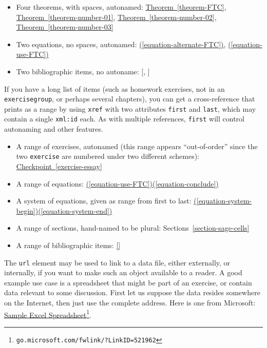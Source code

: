 \documentclass{sn-jnl}
\theoremstyle{thmstyleone}%
\theoremstyle{thmstyletwo}%
\theoremstyle{thmstylethree}%
\newcommand{\xreffont}{\relax}
\newcommand{\mono}[1]{\texttt{#1}}
\numberwithin{equation}{section}
\begin{document}
\begin{itemize}[label=\textbullet]
\item{}Four theorems, with spaces, autonamed: \hyperref[theorem-FTC]{Theorem~{\xreffont\ref{theorem-FTC}}}, \hyperref[theorem-number-01]{Theorem~{\xreffont\ref{theorem-number-01}}}, \hyperref[theorem-number-02]{Theorem~{\xreffont\ref{theorem-number-02}}}, \hyperref[theorem-number-03]{Theorem~{\xreffont\ref{theorem-number-03}}}%
\item{}Two equations, no spaces, autonamed: \hyperref[equation-alternate-FTC]{({\xreffont\ref{equation-alternate-FTC}})}, \hyperref[equation-use-FTC]{({\xreffont\ref{equation-use-FTC}})}%
\item{}Two bibliographic items, no autoname: [\hyperlink{biblio-judson-AATA}{{\xreffont 1}}, \hyperlink{biblio-lay-article}{{\xreffont 2}}]%
\end{itemize}
%
\par
If you have a long list of items (such as homework exercises, not in an \mono{exercisegroup}, or perhaps several chapters), you can get a cross-reference that prints as a range by using \mono{xref} with two attributes \mono{first} and \mono{last}, which may contain a single \mono{xml:id} each.  As with multiple references, \mono{first} will control autonaming and other features.%
\begin{itemize}[label=\textbullet]
\item{}A range of exercises, autonamed (this range appears ``out-of-order'' since the two \mono{exercise} are numbered under two different schemes): \hyperref[exercise-essay]{Checkpoint~{\xreffont\ref{exercise-essay}}\textendash{}{\xreffont 1}}%
\item{}A range of equations: \hyperref[equation-use-FTC]{({\xreffont\ref{equation-use-FTC}})\textendash{}({\xreffont\ref{equation-conclude}})}%
\item{}A system of equations, given as range from first to last: \hyperref[equation-system-begin]{({\xreffont\ref{equation-system-begin}})\textendash{}({\xreffont\ref{equation-system-end}})}%
\item{}A range of sections, hand-named to be plural: Sections~\hyperref[section-sage-cells]{{\xreffont\ref{section-sage-cells}}\textendash{}{\xreffont\ref{section-cross-referencing}}}%
\item{}A range of bibliographic items: \hyperlink{biblio-judson-AATA}{[{\xreffont 1}\textendash{}{\xreffont 2}]}%
\end{itemize}
%
\par
The \mono{url} element may be used to link to a data file, either externally, or internally, if you want to make such an object available to a reader.  A good example use case is a spreadsheet that might be part of an exercise, or contain data relevant to some discussion.  First let us suppose the data resides somewhere on the Internet, then just use the complete address.  Here is one from Microsoft: \href{http://go.microsoft.com/fwlink/?LinkID=521962}{Sample Excel Spreadsheet}\footnote{\nolinkurl{go.microsoft.com/fwlink/?LinkID=521962}\label{section-cross-referencing-16-5}}.%
\end{document}
